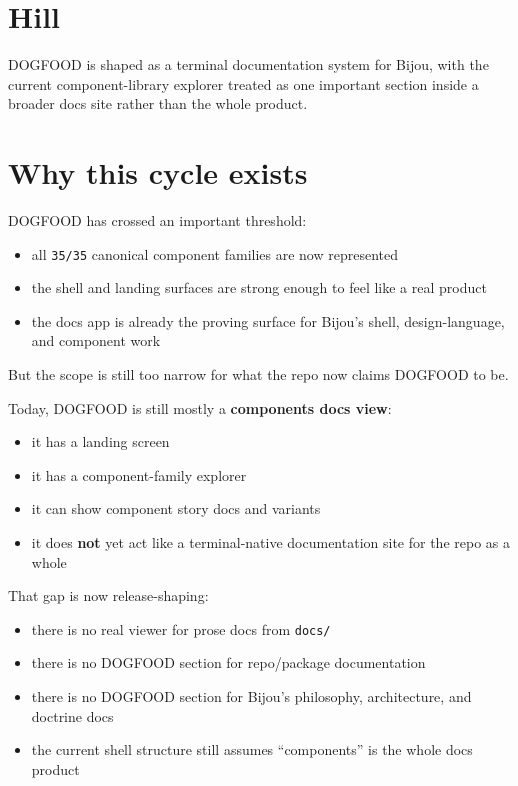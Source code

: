 \section{Hill}\label{record-082-hill}

DOGFOOD is shaped as a terminal documentation system for Bijou, with the current component-library explorer treated as one important section inside a broader docs site rather than the whole product.

\section{Why this cycle exists}\label{record-082-why-this-cycle-exists}

DOGFOOD has crossed an important threshold:

\begin{itemize}
\tightlist
\item
  all \texttt{3\allowbreak{}5\allowbreak{}/\allowbreak{}3\allowbreak{}5} canonical component families are now represented
\item
  the shell and landing surfaces are strong enough to feel like a real product
\item
  the docs app is already the proving surface for Bijou's shell, design-language, and component work
\end{itemize}

But the scope is still too narrow for what the repo now claims DOGFOOD to be.

Today, DOGFOOD is still mostly a \textbf{components docs view}:

\begin{itemize}
\tightlist
\item
  it has a landing screen
\item
  it has a component-family explorer
\item
  it can show component story docs and variants
\item
  it does \textbf{not} yet act like a terminal-native documentation site for the repo as a whole
\end{itemize}

That gap is now release-shaping:

\begin{itemize}
\tightlist
\item
  there is no real viewer for prose docs from \texttt{d\allowbreak{}o\allowbreak{}c\allowbreak{}s\allowbreak{}/}
\item
  there is no DOGFOOD section for repo/package documentation
\item
  there is no DOGFOOD section for Bijou's philosophy, architecture, and doctrine docs
\item
  the current shell structure still assumes ``components'' is the whole docs product
\end{itemize}


